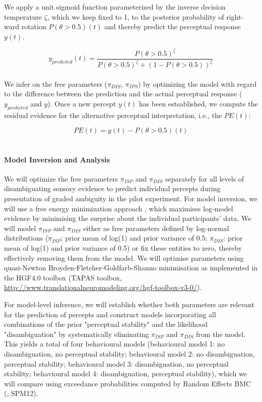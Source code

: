 \documentclass[12pt]{article}
\begin{document}
We apply a unit sigmoid function parameterized by the inverse decision temperature $\zeta$, which we keep fixed to 1, to the posterior probability of right-ward rotation $P(\theta>0.5)(t)$ and thereby predict the perceptual response $y(t)$. 

\begin{equation}
 y_{predicted}(t) = \frac{P(\theta > 0.5)^\zeta}{P(\theta > 0.5)^\zeta+(1-P(\theta > 0.5))^\zeta}
\end{equation} \\

We infer on the free parameters ($\pi_{DIS}$, $\pi_{IPS}$) by optimizing the model with regard to the difference between the prediction and the actual perceptual response ($y_{predicted}$ and $y$). Once a new percept $y(t)$ has been estsablished, we compute the residual evidence for the alternative perceptual interpretation, i.e., the $PE(t)$:

\begin{equation}
PE(t) = y(t) - P(\theta > 0.5)(t)
\end{equation}\\

\paragraph{Model Inversion and Analysis}

We will optimize the free parameters $\pi_{ISP}$ and $\pi_{DIS}$ separately for all levels of disambiguating sensory evidence to predict individual percepts during presentation of graded ambiguity in the pilot experiment. For model inversion, we will use a free energy minimization approach \parencite{Friston2007}, which maximises log-model evidence by minimising the surprise about the individual participants' data. We will model $\pi_{ISP}$ and $\pi_{DIS}$ either as free parameters defined by log-normal distributions ($\pi_{ISP}$: prior mean of log(1) and prior variance of 0.5; $\pi_{DIS}$: prior mean of log(1) and prior variance of 0.5) or fix these entities to zero, thereby effectively removing them from the model. We will optimise parameters using quasi-Newton Broyden-Fletcher-Goldfarb-Shanno minimisation as implemented in the HGF4.0 toolbox (TAPAS toolbox, \url{http://www.translationalneuromodeling.org/hgf-toolbox-v3-0/}).

For model-level inference, we will establish whether both parameters are relevant for the prediction of percepts and construct models incorporating all combinations of the prior "perceptual stability" and the likelihood "disambiguation" by systematically eliminating $\pi_{ISP}$ and $\pi_{DIS}$ from the model. This yields a total of four behavioural models (behavioural model 1: no disambiguation, no perceptual stability; behavioural model 2: no disambiguation, perceptual stability; behavioural model 3: disambiguation, no perceptual stability; behavioural model 4: disambiguation, perceptual stability), which we will compare using exceedance probabilities computed by Random Effects BMC (\cite{Stephan2009}, SPM12).
\end{document}
